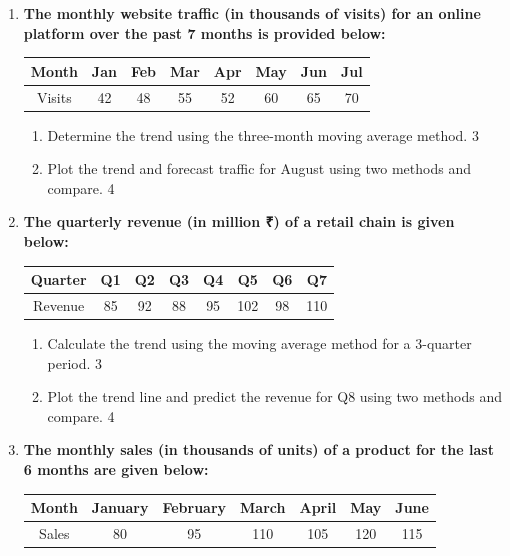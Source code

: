 \documentclass[a4paper,oneside]{book}
\begin{document}
\begin{enumerate}
\begin{enumerate}
\item
\textbf{The monthly website traffic (in thousands of visits) for an online platform over the past 7 months is provided below:}

\begin{table}[h]
\centering
\begin{tabular}{cccccccc}
Month & Jan & Feb & Mar & Apr & May & Jun & Jul \\ \hline
Visits & 42 & 48 & 55 & 52 & 60 & 65 & 70 \\
\end{tabular}
\end{table}

\begin{enumerate}
\item
Determine the trend using the three-month moving average method. \hfill 3
\item
Plot the trend and forecast traffic for August using two methods 
and compare. \hfill 4
\end{enumerate}

\item
\textbf{The quarterly revenue (in million ₹) of a retail chain is given below:}

\begin{table}[h]
\centering
\begin{tabular}{cccccccc}
Quarter & Q1 & Q2 & Q3 & Q4 & Q5 & Q6 & Q7 \\ \hline
Revenue & 85 & 92 & 88 & 95 & 102 & 98 & 110 \\
\end{tabular}
\end{table}

\begin{enumerate}
\item
Calculate the trend using the moving average method for a 3-quarter period. \hfill 3
\item
Plot the trend line and predict the revenue for Q8 using two methods 
and compare. \hfill 4
\end{enumerate}
  
  \item
\textbf{The monthly sales (in thousands of units) of a product for the last 6 months are given below:}

\begin{table}[h]
\centering
\begin{tabular}{ccccccc}
Month     & January & February & March & April & May & June \\ \hline
Sales     & 80      & 95       & 110   & 105   & 120  & 115  \\
\end{tabular}
\end{table}


\end{enumerate}
\end{enumerate}
\end{document}
